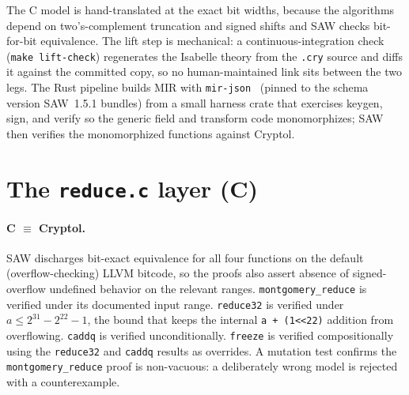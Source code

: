 \documentclass[11pt]{article}
\newcommand{\code}[1]{\texttt{#1}}
\begin{document}
The C model is hand-translated at the exact bit widths, because the algorithms depend on two's-complement
truncation and signed shifts and SAW checks bit-for-bit equivalence. The lift step is mechanical: a
continuous-integration check (\code{make lift-check}) regenerates the Isabelle theory from the
\code{.cry} source and diffs it against the committed copy, so no human-maintained link sits between the
two legs. The Rust pipeline builds MIR with \code{mir-json}~\cite{mirjson} (pinned to the schema version
SAW~1.5.1 bundles) from a small harness crate that exercises keygen, sign, and verify so the generic
field and transform code monomorphizes; SAW then verifies the monomorphized functions against Cryptol.

\section{The \code{reduce.c} layer (C)}\label{sec:reduce}

\paragraph{C $\equiv$ Cryptol.} SAW discharges bit-exact equivalence for all four functions on the
default (overflow-checking) LLVM bitcode, so the proofs also assert absence of signed-overflow undefined
behavior on the relevant ranges. \code{montgomery\_reduce} is verified under its documented input range.
\code{reduce32} is verified under $a \le 2^{31} - 2^{22} - 1$, the bound that keeps the internal
\code{a + (1{<}{<}22)} addition from overflowing. \code{caddq} is verified unconditionally. \code{freeze}
is verified compositionally using the \code{reduce32} and \code{caddq} results as overrides. A mutation
test confirms the \code{montgomery\_reduce} proof is non-vacuous: a deliberately wrong model is rejected
with a counterexample.
\end{document}
